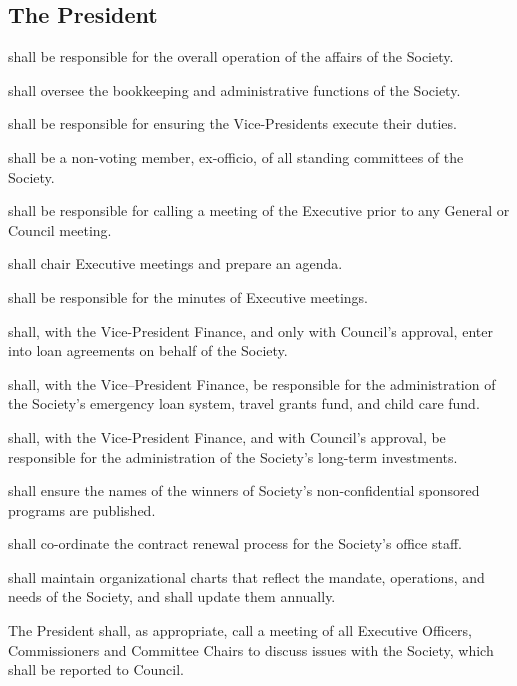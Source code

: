 \subsection {The President}
\begin{longenum}[ label*=\thesubsection.\arabic*., align=left]
	\item shall be responsible for the overall operation of the affairs of the Society.
    \item shall oversee the bookkeeping and administrative functions of the Society. 
    \item shall be responsible for ensuring the Vice-Presidents execute their duties. 
    \item shall be a non-voting member, ex-officio, of all standing committees of the Society.
    \item shall be responsible for calling a meeting of the Executive prior to any General or Council meeting.
    \item shall chair Executive meetings and prepare an agenda.
    \item shall be responsible for the minutes of Executive meetings. 
    \item shall, with the Vice-President Finance, and only with Council's approval, enter into loan agreements on behalf of the Society.
    \item shall, with the Vice--President Finance, be responsible for the administration of the Society's emergency loan system, travel grants fund, and child care fund. 
    \item shall, with the Vice-President Finance, and with Council's approval, be responsible for the administration of the Society's long-term investments. 
    \item shall ensure the names of the winners of Society's non-confidential sponsored programs are published.
    \item shall co-ordinate the contract renewal process for the Society's office staff. 
    \item shall maintain organizational charts that reflect the mandate, operations, and needs of the Society, and shall update them annually. 
    \item The President shall, as appropriate, call a meeting of all Executive Officers, Commissioners and Committee Chairs to discuss issues with the Society, which shall be reported to Council.
\end{longenum}


